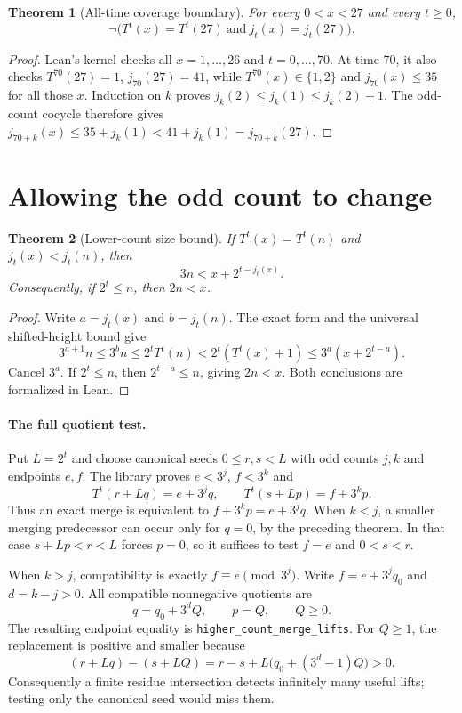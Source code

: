 \documentclass[10pt]{article}
\newtheorem{theorem}{Theorem}
\begin{document}
\begin{theorem}[All-time coverage boundary]
For every $0<x<27$ and every $t\geq0$,
\[
\neg\bigl(T^t(x)=T^t(27)\ \text{and}\ j_t(x)=j_t(27)\bigr).
\]
\end{theorem}
\begin{proof}
Lean's kernel checks all $x=1,\ldots,26$ and $t=0,\ldots,70$.
At time 70, it also checks $T^{70}(27)=1$, $j_{70}(27)=41$, while
$T^{70}(x)\in\{1,2\}$ and $j_{70}(x)\leq35$ for all those $x$.
Induction on $k$ proves $j_k(2)\leq j_k(1)\leq j_k(2)+1$.
The odd-count cocycle therefore gives
$j_{70+k}(x)\leq35+j_k(1)<41+j_k(1)=j_{70+k}(27)$.
\end{proof}

\newpage
\section*{Allowing the odd count to change}
\begin{theorem}[Lower-count size bound]
If $T^t(x)=T^t(n)$ and $j_t(x)<j_t(n)$, then
\[
3n<x+2^{t-j_t(x)}.
\]
Consequently, if $2^t\leq n$, then $2n<x$.
\end{theorem}
\begin{proof}
Write $a=j_t(x)$ and $b=j_t(n)$. The exact form and the universal
shifted-height bound give
\[
3^{a+1}n\leq3^bn\leq2^tT^t(n)
 <2^t(T^t(x)+1)\leq3^a(x+2^{t-a}).
\]
Cancel $3^a$. If $2^t\leq n$, then $2^{t-a}\leq n$, giving $2n<x$.
Both conclusions are formalized in Lean.
\end{proof}

\paragraph{The full quotient test.}
Put $L=2^t$ and choose canonical seeds $0\leq r,s<L$ with odd counts
$j,k$ and endpoints $e,f$. The library proves $e<3^j$, $f<3^k$ and
\[
T^t(r+Lq)=e+3^jq,\qquad T^t(s+Lp)=f+3^kp.
\]
Thus an exact merge is equivalent to $f+3^kp=e+3^jq$.
When $k<j$, a smaller merging predecessor can occur only for $q=0$,
by the preceding theorem. In that case $s+Lp<r<L$ forces $p=0$,
so it suffices to test $f=e$ and $0<s<r$.

When $k>j$, compatibility is exactly $f\equiv e\pmod{3^j}$. Write
$f=e+3^jq_0$ and $d=k-j>0$. All compatible nonnegative quotients are
\[
q=q_0+3^dQ,\qquad p=Q,\qquad Q\geq0.
\]
The resulting endpoint equality is \texttt{higher\_count\_merge\_lifts}.
For $Q\geq1$, the replacement is positive and smaller because
\[
(r+Lq)-(s+LQ)=r-s+L\bigl(q_0+(3^d-1)Q\bigr)>0.
\]
Consequently a finite residue intersection detects infinitely many useful
lifts; testing only the canonical seed would miss them.
\end{document}
